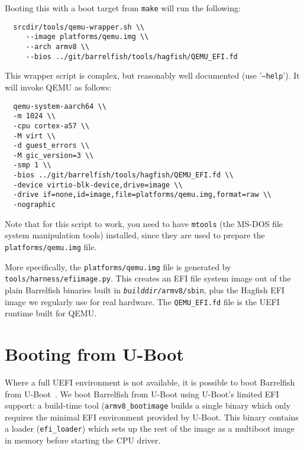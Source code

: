 \documentclass[a4paper,twoside]{report}
\def\qemu{QEMU\xspace}
\begin{document}
Booting this with a boot target from \texttt{make} will run the
following:
\begin{lstlisting}
  srcdir/tools/qemu-wrapper.sh \\
     --image platforms/qemu.img \\
     --arch armv8 \\
     --bios ../git/barrelfish/tools/hagfish/QEMU_EFI.fd
\end{lstlisting}

This wrapper script is complex, but reasonably well documented (use
'\texttt{--help}').  It will invoke \qemu as follows:
\begin{lstlisting}
  qemu-system-aarch64 \\
  -m 1024 \\
  -cpu cortex-a57 \\
  -M virt \\
  -d guest_errors \\
  -M gic_version=3 \\
  -smp 1 \\
  -bios ../git/barrelfish/tools/hagfish/QEMU_EFI.fd \\
  -device virtio-blk-device,drive=image \\
  -drive if=none,id=image,file=platforms/qemu.img,format=raw \\
  -nographic
\end{lstlisting}


Note that for this script to work, you need to have \texttt{mtools}
(the MS-DOS file system manipulation tools) installed, since they are
used to prepare the \texttt{platforms/qemu.img} file.

More specifically, the \texttt{platforms/qemu.img} file is generated
by \texttt{tools/harness/efiimage.py}.  This creates an EFI file
system image out of the plain Barrelfish binaries built in
\texttt{\textit{builddir}/armv8/sbin}, plus the Hagfish EFI image we
regularly use for real hardware.  The \texttt{QEMU\_EFI.fd} file is
the UEFI runtime built for \qemu. 

\section{Booting from U-Boot}\label{s:uboot}

Where a full UEFI environment is not available, it is possible to boot
Barrelfish from U-Boot~\cite{uboot}.  We boot Barrelfish from U-Boot
using U-Boot's limited EFI support: a build-time tool
(\texttt{armv8\_bootimage} builds a single binary which only requires
the minimal EFI environment provided by U-Boot.   This binary contains
a loader (\texttt{efi\_loader}) which sets up the rest of the image as
a multiboot image in memory before starting the CPU driver.
\end{document}
